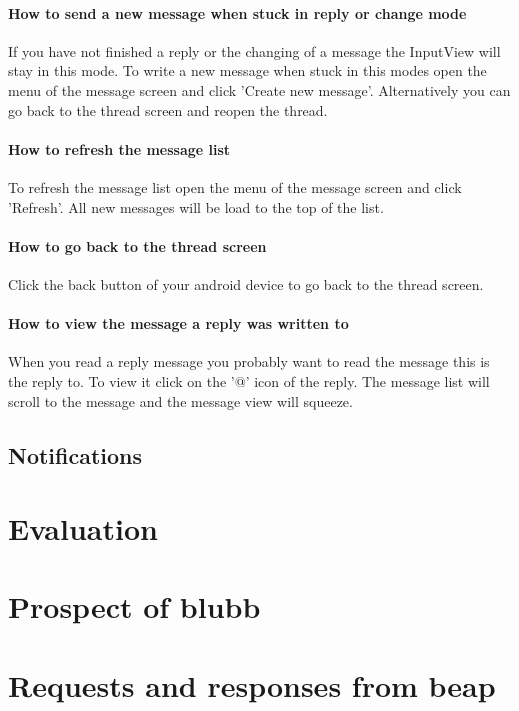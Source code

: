 \documentclass[12pt,a4paper,oneside]{report}
\begin{document}
\subsubsection{How to send a new message when stuck in reply or change mode}
If you have not finished a reply or the changing of a message the InputView will stay in this mode. To write a new message when stuck in this modes open the menu of the message screen and click 'Create new message'. Alternatively you can go back to the thread screen and reopen the thread.

\subsubsection{How to refresh the message list}
To refresh the message list open the menu of the message screen and click 'Refresh'. All new messages will be load to the top of the list.

\subsubsection{How to go back to the thread screen}
Click the back button of your android device to go back to the thread screen.

\subsubsection{How to view the message a reply was written to}
When you read a reply message you probably want to read the message this is the reply to. To view it click on the '@' icon of the reply. The message list will scroll to the message and the message view will squeeze. 

\section{Notifications}

\chapter{Evaluation}

\chapter{Prospect of blubb}

\printbibliography
%

\appendix
\chapter{Requests and responses from beap}
\lstset{language=JavaScript}
\end{document}
